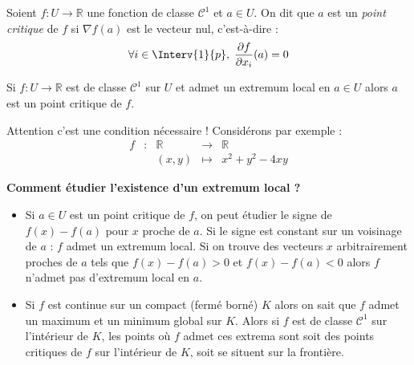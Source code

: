 \documentclass[a4paper,10pt]{report}
\begin{document}
\begin{defin}
Soient $f : U \rightarrow \mathbb{R}$ une fonction de classe $\mathcal{C}^1$ et $a \in U$. On dit que $a$ est un \textit{point critique} de $f$ si $\nabla f (a)$ est le vecteur nul, c'est-à-dire :
$$ \forall i \in \Interv{1}{p}, \; \dfrac{\partial f}{\partial x_i}(a)= 0 $$
\end{defin}

\begin{prop}
Si $f : U \rightarrow \mathbb{R}$ est de classe $\mathcal{C}^1$ sur $U$ et admet un extremum local en $a \in U$ alors $a$ est un point critique de $f$.
\end{prop}

\begin{preuve}

\vspace{5cm}
\end{preuve}

\newpage
\begin{rem}
Attention c'est une condition nécessaire ! Considérons par exemple :
$$ \begin{array}{cccll}
f& : & \mathbb{R} & \rightarrow & \mathbb{R} \\
& & (x,y) & \mapsto & x^2+y^2-4xy 
\end{array}$$

\vspace{5cm}
\end{rem}

\medskip

\begin{center}
\textbf{Comment étudier l'existence d'un extremum local ?}
\end{center}

\medskip

\begin{itemize}
\item Si $a \in U$ est un point critique de $f$, on peut étudier le signe de $f(x)-f(a)$ pour $x$ proche de $a$. Si le signe est constant sur un voisinage de $a$ : $f$ admet un extremum local. Si on trouve des vecteurs $x$ arbitrairement proches de $a$ tels que $f(x)-f(a)>0$ et $f(x)-f(a)<0$ alors $f$ n'admet pas d'extremum local en $a$.
\item Si $f$ est continue sur un compact (fermé borné) $K$ alors on sait que $f$ admet un maximum et un minimum global sur $K$. Alors si $f$ est de classe $\mathcal{C}^1$ sur l'intérieur de $K$, les points où $f$ admet ces extrema sont soit des points critiques de $f$ sur l'intérieur de $K$, soit se situent sur la frontière.
\end{itemize}
\end{document}
